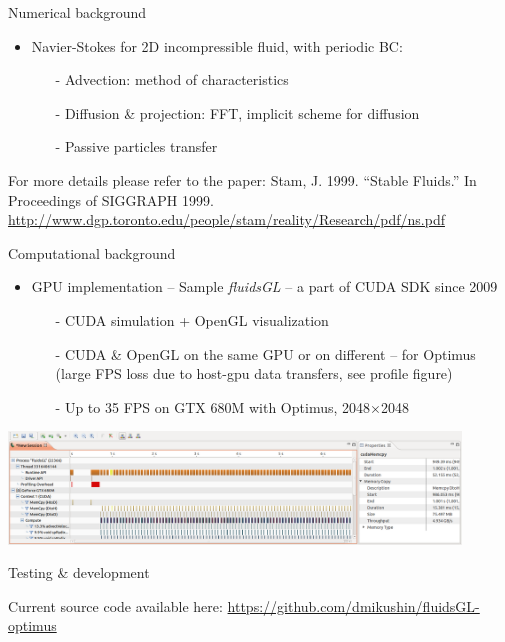\documentclass[aspectratio=169]{beamer}
\begin{document}
\begin{frame}[fragile]{Numerical background}

\begin{itemize}
\item Navier-Stokes for 2D incompressible fluid, with periodic BC:
\vskip5pt
\begin{itemize}
\item[-] Advection: method of characteristics
\item[-] Diffusion \& projection: FFT, implicit scheme for diffusion
\item[-] Passive particles transfer
\end{itemize}
\end{itemize}
\vskip10pt
For more details please refer to the paper:
\vskip8pt
Stam, J. 1999. ``Stable Fluids.'' In Proceedings of SIGGRAPH 1999. \href{http://www.dgp.toronto.edu/people/stam/reality/Research/pdf/ns.pdf}{http://www.dgp.toronto.edu/people/stam/reality/Research/pdf/ns.pdf}
\end{frame}



\begin{frame}[fragile]{Computational background}

\begin{itemize}
\item GPU implementation -- Sample \emph{fluidsGL} -- a part of CUDA SDK since 2009
\vskip5pt
\begin{itemize}
\item[-] CUDA simulation + OpenGL visualization
\item[-] CUDA \& OpenGL on the same GPU or on different -- for Optimus\\ (large FPS loss due to host-gpu data transfers, see profile figure)
\item[-] Up to 35 FPS on GTX 680M  with Optimus, 2048$\times$2048
\end{itemize}
\end{itemize}

\vskip5pt

\hskip43pt\includegraphics[width=12cm]{figures/profiler}

\end{frame}



\begin{frame}[fragile]{Testing \& development}

Current source code available here: \href{https://github.com/dmikushin/fluidsGL-optimus}{https://github.com/dmikushin/fluidsGL-optimus}

\end{frame}
\end{document}
